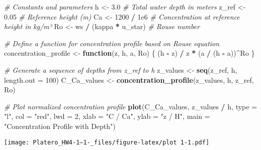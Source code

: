 \documentclass[
]{article}
\newenvironment{Shaded}{\begin{snugshade}}{\end{snugshade}}
\newcommand{\AttributeTok}[1]{\textcolor[rgb]{0.13,0.29,0.53}{#1}}
\newcommand{\CommentTok}[1]{\textcolor[rgb]{0.56,0.35,0.01}{\textit{#1}}}
\newcommand{\ControlFlowTok}[1]{\textcolor[rgb]{0.13,0.29,0.53}{\textbf{#1}}}
\newcommand{\DecValTok}[1]{\textcolor[rgb]{0.00,0.00,0.81}{#1}}
\newcommand{\FloatTok}[1]{\textcolor[rgb]{0.00,0.00,0.81}{#1}}
\newcommand{\FunctionTok}[1]{\textcolor[rgb]{0.13,0.29,0.53}{\textbf{#1}}}
\newcommand{\NormalTok}[1]{#1}
\newcommand{\OtherTok}[1]{\textcolor[rgb]{0.56,0.35,0.01}{#1}}
\newcommand{\SpecialCharTok}[1]{\textcolor[rgb]{0.81,0.36,0.00}{\textbf{#1}}}
\newcommand{\StringTok}[1]{\textcolor[rgb]{0.31,0.60,0.02}{#1}}
\begin{document}
\begin{Shaded}
\begin{Highlighting}[]
\CommentTok{\# Constants and parameters}
\NormalTok{h }\OtherTok{\textless{}{-}} \FloatTok{3.0}                      \CommentTok{\# Total water depth in meters}
\NormalTok{z\_ref }\OtherTok{\textless{}{-}} \FloatTok{0.05}                 \CommentTok{\# Reference height (m)}
\NormalTok{Ca }\OtherTok{\textless{}{-}} \DecValTok{1200} \SpecialCharTok{/} \FloatTok{1e6}              \CommentTok{\# Concentration at reference height in kg/m³}
\NormalTok{Ro }\OtherTok{\textless{}{-}}\NormalTok{ ws }\SpecialCharTok{/}\NormalTok{ (kappa }\SpecialCharTok{*}\NormalTok{ u\_star)   }\CommentTok{\# Rouse number}

\CommentTok{\# Define a function for concentration profile based on Rouse equation}
\NormalTok{concentration\_profile }\OtherTok{\textless{}{-}} \ControlFlowTok{function}\NormalTok{(z, h, a, Ro) \{}
\NormalTok{  (h }\SpecialCharTok{{-}}\NormalTok{ z) }\SpecialCharTok{/}\NormalTok{ z }\SpecialCharTok{*}\NormalTok{ (a }\SpecialCharTok{/}\NormalTok{ (h }\SpecialCharTok{{-}}\NormalTok{ a))}\SpecialCharTok{\^{}}\NormalTok{Ro}
\NormalTok{\}}

\CommentTok{\# Generate a sequence of depths from z\_ref to h}
\NormalTok{z\_values }\OtherTok{\textless{}{-}} \FunctionTok{seq}\NormalTok{(z\_ref, h, }\AttributeTok{length.out =} \DecValTok{100}\NormalTok{)}
\NormalTok{C\_Ca\_values }\OtherTok{\textless{}{-}} \FunctionTok{concentration\_profile}\NormalTok{(z\_values, h, z\_ref, Ro)}

\CommentTok{\# Plot normalized concentration profile}
\FunctionTok{plot}\NormalTok{(C\_Ca\_values, z\_values }\SpecialCharTok{/}\NormalTok{ h, }\AttributeTok{type =} \StringTok{"l"}\NormalTok{, }\AttributeTok{col =} \StringTok{"red"}\NormalTok{, }\AttributeTok{lwd =} \DecValTok{2}\NormalTok{,}
     \AttributeTok{xlab =} \StringTok{"C / Ca"}\NormalTok{, }\AttributeTok{ylab =} \StringTok{"z / H"}\NormalTok{, }\AttributeTok{main =} \StringTok{"Concentration Profile with Depth"}\NormalTok{)}
\end{Highlighting}
\end{Shaded}

\texttt{[image: Platero\_HW4-1--1-\_files/figure-latex/plot 1-1.pdf]}
\end{document}
